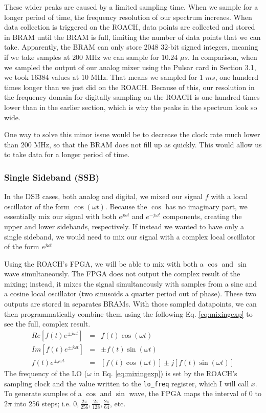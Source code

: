 \documentclass[12pt]{article}
\begin{document}
These wider peaks are caused by a limited sampling time. When we sample for a longer period of time, the frequency resolution of our spectrum increaes. When data collection is triggered on the ROACH, data points are collected and stored in BRAM until the BRAM is full, limiting the number of data points that we can take. Apparently, the BRAM can only store 2048 32-bit signed integers, meaning if we take samples at $200$ MHz we can sample for $10.24$ $\mu s$. In comparison, when we sampled the output of our analog mixer using the Pulsar card in Section 3.1, we took 16384 values at $10$ MHz. That means we sampled for $1$ $ms$, one hunderd times longer than we just did on the ROACH. Because of this, our resolution in the frequency domain for digitally sampling on the ROACH is one hundred times lower than in the earlier section, which is why the peaks in the spectrum look so wide.

One way to solve this minor issue would be to decrease the clock rate much lower than $200$ MHz, so that the BRAM does not fill up as quickly. This would allow us to take data for a longer period of time.



\subsubsection{Single Sideband (SSB)}
In the DSB cases, both analog and digital, we mixed our signal $f$ with a local oscillator of the form $\cos(\omega t)$. Because the $\cos$ has no imaginary part, we essentially mix our signal with both $e^{j \omega t}$ and $e^{-j \omega t}$ components, creating the upper and lower sidebands, respectively. If instead we wanted to have only a single sideband, we would need to mix our signal with a complex local oscillator of the form $e^{j \omega t}$

Using the ROACH's FPGA, we will be able to mix with both a $\cos$ and $\sin$ wave simultaneously. The FPGA does not output the complex result of the mixing; instead, it mixes the signal simultaneously with samples from a sine and a cosine local oscillator (two sinusoids a quarter period out of phase). These two outputs are stored in separates BRAMs. With those sampled datapoints, we can then programmatically combine them using the following Eq. \ref{eq:mixingexp} to see the full, complex result.
\begin{eqnarray}
Re[f(t) e^{\pm j\omega t}] &=& f(t) \cos(\omega t)\nonumber\\
Im[f(t) e^{\pm j\omega t}] &=& \pm f(t) \sin(\omega t) \nonumber\\
f(t) e^{\pm j\omega t} &=& [f(t) \cos(\omega t)] \pm j [f(t) \sin(\omega t)] \label{eq:mixingexp}
\end{eqnarray}
The frequency of the LO ($\omega$ in Eq. \ref{eq:mixingexp}) is set by the ROACH's sampling clock and the value written to the \texttt{lo\_freq} register, which I will call $x$. To generate samples of a $\cos$ and $\sin$ wave, the FPGA maps the interval of $0$ to $2\pi$ into 256 steps; i.e. $0, \frac{2\pi}{256}, \frac{2\pi}{128}, \frac{2\pi}{64}$, etc. 
\end{document}
